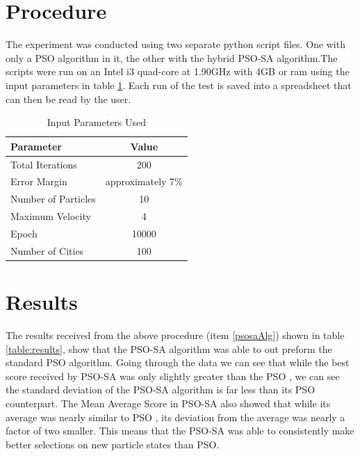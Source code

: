 \documentclass{article}[]
\begin{document}
\newpage
\section{Procedure}
The experiment was conducted using two separate python script files. One with only a PSO algorithm in it, the other
with the hybrid PSO-SA algorithm.The scripts were run on an Intel i3 quad-core at 1.90GHz with 4GB or ram using the input parameters in table \ref{table:params}. Each run of the test is saved into a spreadsheet that can then be read by the user.
\begin{table} 
\caption{Input Parameters Used} %
\centering      %
\begin{tabular}{l|c}  %
\hline                      %
{\bf Parameter}&{\bf Value}\\
\hline                    %
Total Iterations & 200\\
Error Margin & approximately 7\% \\
Number of Particles & 10\\
Maximum Velocity & 4\\
Epoch  & 10000\\
Number of Cities & 100\\
\hline     %
\end{tabular} 
\label{table:params} 
 \end{table} 

\section{Results}
The results received from the above procedure (item \ref{psosaAlg}) shown in table \ref{table:results}, show that the PSO-SA algorithm was able to out preform the standard PSO algorithm. Going through the data we can see that while the best score received by PSO-SA was only slightly greater than the PSO , we can see the standard deviation of the PSO-SA algorithm is far less than its PSO counterpart. The Mean Average Score in PSO-SA also showed that while its average was nearly similar to PSO , its deviation from the average was nearly a factor of two smaller. This means that the PSO-SA was able to consistently make better selections on new particle states than PSO.
\end{document}
